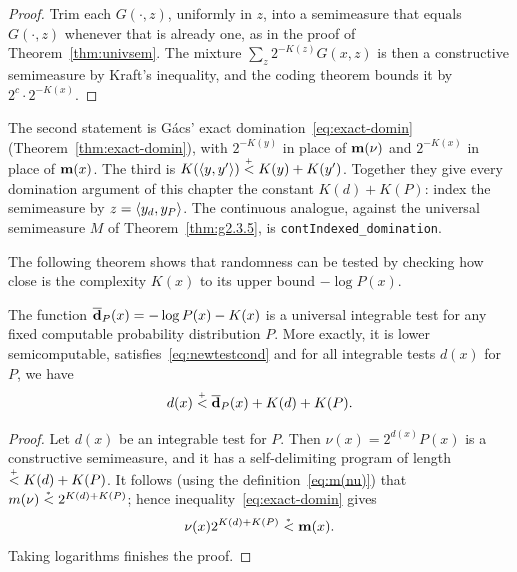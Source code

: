 \begin{proof}
  \leanok
Trim each \( G(\cdot,z) \), uniformly in \( z \), into a semimeasure that equals
\( G(\cdot,z) \) whenever that is already one, as in the proof of
Theorem~\ref{thm:univsem}. The mixture \( \sum_{z} 2^{-K(z)} G(x,z) \) is then a constructive
semimeasure by Kraft's inequality, and the coding theorem bounds it by
\( 2^{c} \cdot 2^{-K(x)} \).
\end{proof}

\begin{formalization}
The second statement is G\'acs' exact domination~\eqref{eq:exact-domin}
(Theorem~\ref{thm:exact-domin}), with \( 2^{-K(y)} \) in place of \( \mathbf{m}(\nu) \) and
\( 2^{-K(x)} \) in place of \( \mathbf{m}(x) \). The third is \( K({\mathopen\langle y,y'\mathclose\rangle}) \stackrel{{}_+}{<} K(y) + K(y') \).
Together they give every domination argument of this chapter the constant
\( K(d) + K(P) \): index the semimeasure by \( z = {\mathopen\langle y_{d}, y_{P}\mathclose\rangle} \). The continuous
analogue, against the universal semimeasure \( M \) of Theorem~\ref{thm:g2.3.5}, is
\texttt{contIndexed\_domination}.
\end{formalization}

The following theorem shows that randomness can be tested by checking how close
is the complexity $K(x)$ to its upper bound $-\log P(x)$.

\begin{theorem}\label{thm:univ-integrable-test}
  \leanok
The function $\overline{\mathbf{d}}_{P}(x)=-\log P(x)-K(x)$
is a universal integrable test for any fixed computable probability
distribution $P$.
More exactly, it is lower
semicomputable, satisfies~\eqref{eq:newtestcond} and
for all integrable tests $d(x)$ for $P$, we have
 \begin{equation*}d(x) \stackrel{{}_+}{<} \overline{\mathbf{d}}_{P}(x) + K(d) + K(P).
 \end{equation*}
 \end{theorem}
 \begin{proof}
  \leanok
Let $d(x)$ be an integrable test for $P$.
Then $\nu(x) = 2^{d(x)}P(x)$ is a constructive semimeasure, and it
has a self-delimiting program of length $\stackrel{{}_+}{<} K(d) + K(P)$.
It follows (using the definition~\eqref{eq:m(nu)})
that $m(\nu) \stackrel{{}_*}{<} 2^{K(d) + K(P)}$; hence inequality~\eqref{eq:exact-domin}
gives
 \[
   \nu(x) 2^{K(d) + K(P)} \stackrel{{}_*}{<} \mathbf{m}(x).
 \]
Taking logarithms finishes the proof.
 \end{proof}

